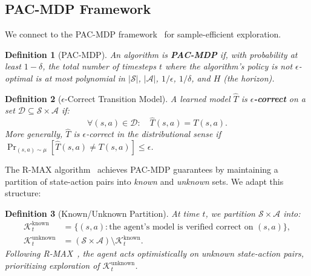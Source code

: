 \documentclass{article}
\newtheorem{definition}{Definition}
\newcommand{\calS}{\mathcal{S}}
\newcommand{\calA}{\mathcal{A}}
\newcommand{\calD}{\mathcal{D}}
\newcommand{\calK}{\mathcal{K}}
\begin{document}
\subsection{PAC-MDP Framework}
\label{sec:pac_mdp}

We connect to the PAC-MDP framework~\cite{kakade2003sample, brafman2002rmax, strehl2009reinforcement} for sample-efficient exploration.

\begin{definition}[PAC-MDP]
\label{def:pac_mdp}
An algorithm is \textbf{PAC-MDP} if, with probability at least $1 - \delta$, the total number of timesteps $t$ where the algorithm's policy is not $\epsilon$-optimal is at most polynomial in $|\calS|$, $|\calA|$, $1/\epsilon$, $1/\delta$, and $H$ (the horizon).
\end{definition}

\begin{definition}[$\epsilon$-Correct Transition Model]
\label{def:eps_correct}
A learned model $\hat{T}$ is \textbf{$\epsilon$-correct} on a set $\calD \subseteq \calS \times \calA$ if:
\begin{equation}
\forall (s, a) \in \calD: \quad \hat{T}(s, a) = T(s, a).
\end{equation}
More generally, $\hat{T}$ is $\epsilon$-correct in the distributional sense if $\Pr_{(s,a) \sim \mu}[\hat{T}(s,a) \neq T(s,a)] \leq \epsilon$.
\end{definition}

The R-MAX algorithm~\cite{brafman2002rmax} achieves PAC-MDP guarantees by maintaining a partition of state-action pairs into \emph{known} and \emph{unknown} sets.  We adapt this structure:

\begin{definition}[Known/Unknown Partition]
\label{def:known_unknown}
At time $t$, we partition $\calS \times \calA$ into:
\begin{align}
\calK_t^{\text{known}} &= \{(s, a) : \text{the agent's model is verified correct on } (s, a)\}, \\
\calK_t^{\text{unknown}} &= (\calS \times \calA) \setminus \calK_t^{\text{known}}.
\end{align}
Following R-MAX~\cite{brafman2002rmax}, the agent acts optimistically on unknown state-action pairs, prioritizing exploration of $\calK_t^{\text{unknown}}$.
\end{definition}


\end{document}

